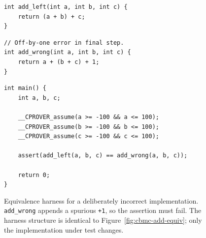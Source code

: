 \documentclass{article}
\begin{document}
\begin{figure}[h]
\begin{minipage}[t]{0.48\linewidth}
\begin{verbatim}
int add_left(int a, int b, int c) {
    return (a + b) + c;
}
\end{verbatim}
\end{minipage}
\hfill
\begin{minipage}[t]{0.48\linewidth}
\begin{verbatim}
// Off-by-one error in final step.
int add_wrong(int a, int b, int c) {
    return a + (b + c) + 1;
}
\end{verbatim}
\end{minipage}

\medskip

\begin{verbatim}
int main() {
    int a, b, c;

    __CPROVER_assume(a >= -100 && a <= 100);
    __CPROVER_assume(b >= -100 && b <= 100);
    __CPROVER_assume(c >= -100 && c <= 100);

    assert(add_left(a, b, c) == add_wrong(a, b, c));

    return 0;
}
\end{verbatim}
\caption{Equivalence harness for a deliberately incorrect implementation. \texttt{add\_wrong} appends a spurious \texttt{+1}, so the assertion must fail. The harness structure is identical to Figure~\ref{fig:cbmc-add-equiv}; only the implementation under test changes.}
\label{fig:cbmc-wrong-harness}
\end{figure}
\end{document}
